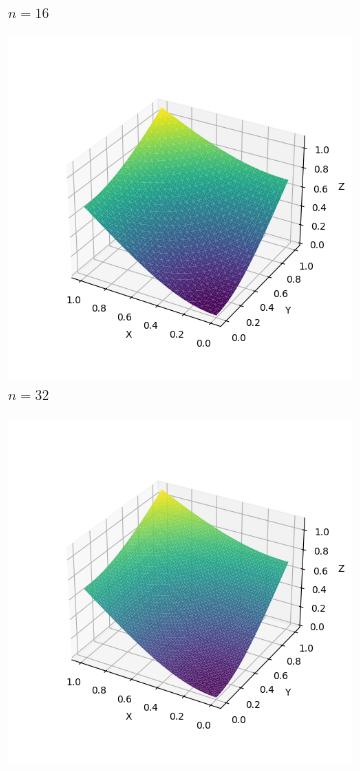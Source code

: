\documentclass[lang=cn,a4paper,newtx,bibend=bibtex]{elegantpaper}
\begin{document}
\begin{figure}[H]
\begin{subfigure}[b]{0.18\textwidth}
      \caption{$n= 16$}
  \end{subfigure}
  \hfill
  \begin{subfigure}[b]{0.18\textwidth}
      \includegraphics[width=\textwidth]{../../res_bac/res-[data|3-Neumann-regular-c32].png}
      \caption{$n = 32$}
  \end{subfigure}
  \hfill
  \begin{subfigure}[b]{0.18\textwidth}
      \includegraphics[width=\textwidth]{../../res_bac/res-[data|3-Neumann-regular-d64].png}

\end{subfigure}
\end{figure}
\end{document}
